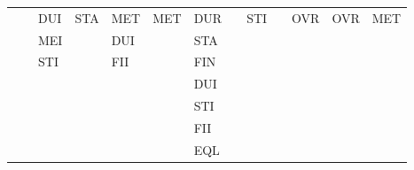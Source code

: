 \documentclass[11pt]{report}
\newenvironment{vvarmargin}[2]
{
  \begin{list}{}
  {
    \setlength{\topsep}{0pt}
    \setlength{\leftmargin}{0pt}
    \setlength{\rightmargin}{0pt}
    \setlength{\listparindent}{\parindent}
    \setlength{\itemindent}{\parindent}
    \setlength{\parsep}{0pt plus 1pt}
    \addtolength{\leftmargin}{#1}\addtolength{\rightmargin}{#2}
  }
  \item
}
{
  \end{list}
}
\begin{document}
\begin{table}[p]
\begin{vvarmargin}{-4cm}{-4cm}
\begin{center}
\begin{tabular}[t]{|r|l|l|l|l|l|l|l|l|l|l|l|l|}
                                          &                         & DUI                     & STA                     & MET                     & MET                     & DUR                     &                         & STI                     &                         & OVR                     & OVR                     & MET                     \\
                                          &                         & MEI                     &                         & DUI                     &                         & STA                     &                         &                         &                         &                         &                         &                         \\
                                          &                         & STI                     &                         & FII                     &                         & FIN                     &                         &                         &                         &                         &                         &                         \\
                                          &                         &                         &                         &                         &                         & DUI                     &                         &                         &                         &                         &                         &                         \\
                                          &                         &                         &                         &                         &                         & STI                     &                         &                         &                         &                         &                         &                         \\
                                          &                         &                         &                         &                         &                         & FII                     &                         &                         &                         &                         &                         &                         \\
                                          &                         &                         &                         &                         &                         & EQL                     &                         &                         &                         &                         &                         &                         \\

\end{tabular}
\end{center}
\end{vvarmargin}
\end{table}
\end{document}
